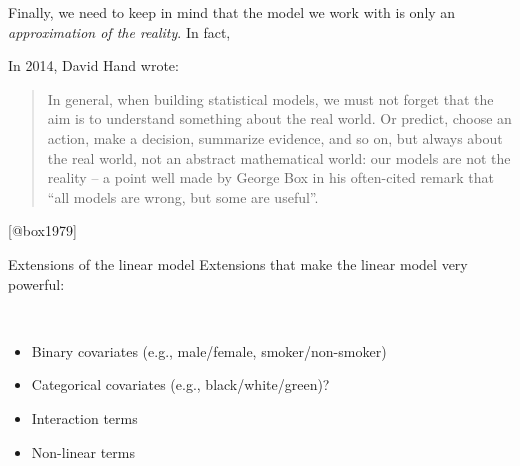 \documentclass[
  10pt,
  ignorenonframetext,
]{beamer}
\providecommand{\tightlist}{%
  \setlength{\itemsep}{0pt}\setlength{\parskip}{0pt}}
\begin{document}
\begin{frame}
Finally, we need to keep in mind that the model we work with is only an
\emph{approximation of the reality}. In fact,

\vspace{4mm}

In 2014, David Hand wrote:

\vspace{4mm}

\begin{quote}
In general, when building statistical models, we must
not forget that the aim is to understand something about
the real world. Or predict, choose an action, make
a decision, summarize evidence, and so on, but always
about the real world, not an abstract mathematical
world: our models are not the reality -- a point well
made by George Box in his often-cited remark that
``all models are wrong, but some are useful''.
\end{quote}

{[}@box1979{]}
\end{frame}

\begin{frame}{Extensions of the linear model}
\protect\hypertarget{extensions-of-the-linear-model}{}
Extensions that make the linear model very powerful:

\(~\)

\begin{itemize}
\tightlist
\item
  Binary covariates (e.g., male/female, smoker/non-smoker)
\end{itemize}

\vspace{2mm}

\begin{itemize}
\tightlist
\item
  Categorical covariates (e.g., black/white/green)?
\end{itemize}

\vspace{2mm}

\begin{itemize}
\tightlist
\item
  Interaction terms
\end{itemize}

\vspace{2mm}

\begin{itemize}
\tightlist
\item
  Non-linear terms
\end{itemize}
\end{frame}
\end{document}
